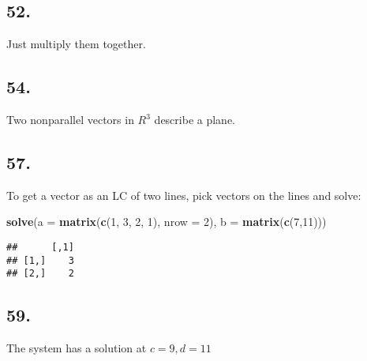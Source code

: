 \documentclass[]{article}
\newenvironment{Shaded}{\begin{snugshade}}{\end{snugshade}}
\newcommand{\DataTypeTok}[1]{\textcolor[rgb]{0.13,0.29,0.53}{#1}}
\newcommand{\DecValTok}[1]{\textcolor[rgb]{0.00,0.00,0.81}{#1}}
\newcommand{\KeywordTok}[1]{\textcolor[rgb]{0.13,0.29,0.53}{\textbf{#1}}}
\newcommand{\NormalTok}[1]{#1}
\newcommand{\OperatorTok}[1]{\textcolor[rgb]{0.81,0.36,0.00}{\textbf{#1}}}
\newcommand{\StringTok}[1]{\textcolor[rgb]{0.31,0.60,0.02}{#1}}
\begin{document}
\hypertarget{section-23}{%
\subsection{52.}\label{section-23}}

Just multiply them together.

\hypertarget{section-24}{%
\subsection{54.}\label{section-24}}

Two nonparallel vectors in \(R^3\) describe a plane.

\hypertarget{section-25}{%
\subsection{57.}\label{section-25}}

To get a vector as an LC of two lines, pick vectors on the lines and
solve:

\begin{Shaded}
\begin{Highlighting}[]
\KeywordTok{solve}\NormalTok{(}\DataTypeTok{a =} \KeywordTok{matrix}\NormalTok{(}\KeywordTok{c}\NormalTok{(}\DecValTok{1}\NormalTok{, }\DecValTok{3}\NormalTok{, }\DecValTok{2}\NormalTok{, }\DecValTok{1}\NormalTok{), }\DataTypeTok{nrow =} \DecValTok{2}\NormalTok{), }\DataTypeTok{b =} \KeywordTok{matrix}\NormalTok{(}\KeywordTok{c}\NormalTok{(}\DecValTok{7}\NormalTok{,}\DecValTok{11}\NormalTok{)))}
\end{Highlighting}
\end{Shaded}

\begin{verbatim}
##      [,1]
## [1,]    3
## [2,]    2
\end{verbatim}

\hypertarget{section-26}{%
\subsection{59.}\label{section-26}}

The system has a solution at \(c=9, d= 11\)

\begin{Shaded}
\end{Shaded}
\end{document}
